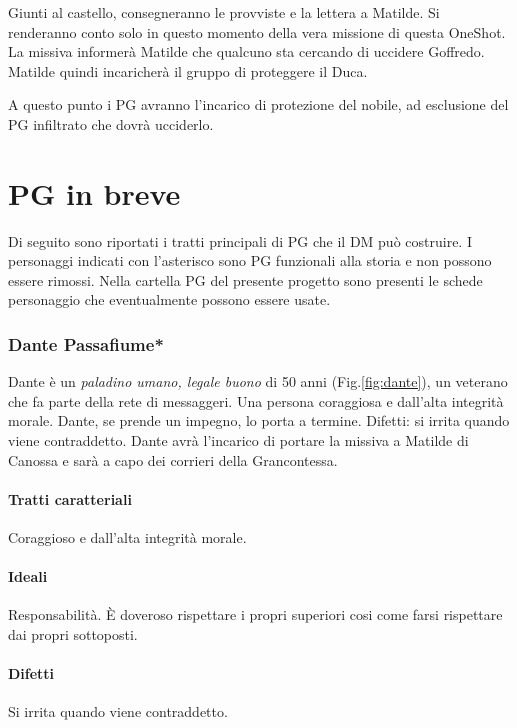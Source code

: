 \documentclass[letterpaper,twocolumn,openany,nodeprecatedcode]{dndbook}
\begin{document}
Giunti al castello, consegneranno le provviste e la lettera a Matilde. Si renderanno conto solo in questo momento della vera missione di questa OneShot. La missiva informerà Matilde che qualcuno sta cercando di uccidere Goffredo. Matilde quindi incaricherà il gruppo di proteggere il Duca.

A questo punto i PG avranno l'incarico di protezione del nobile, ad esclusione del PG infiltrato che dovrà ucciderlo.


\section{PG in breve}\label{PG}
Di seguito sono riportati i tratti principali di PG che il DM può costruire. I personaggi indicati con l'asterisco sono PG funzionali alla storia e non possono essere rimossi. Nella cartella PG del presente progetto sono presenti le schede personaggio che eventualmente possono essere usate.

\subsubsection{Dante Passafiume*}
Dante è un \textit{paladino umano, legale buono} di 50 anni (Fig.\ref{fig:dante}), un veterano che fa parte della rete di messaggeri. Una persona coraggiosa e dall'alta integrità morale. Dante, se prende un impegno, lo porta a termine. Difetti: si irrita quando viene contraddetto. Dante avrà l'incarico di portare la missiva a Matilde di Canossa e sarà a capo dei corrieri della Grancontessa.
\paragraph{Tratti caratteriali} Coraggioso e dall'alta integrità morale.
\paragraph{Ideali} Responsabilità. È doveroso rispettare i propri superiori cosi come farsi rispettare dai propri sottoposti.
\paragraph{Difetti} Si irrita quando viene contraddetto.
\end{document}

